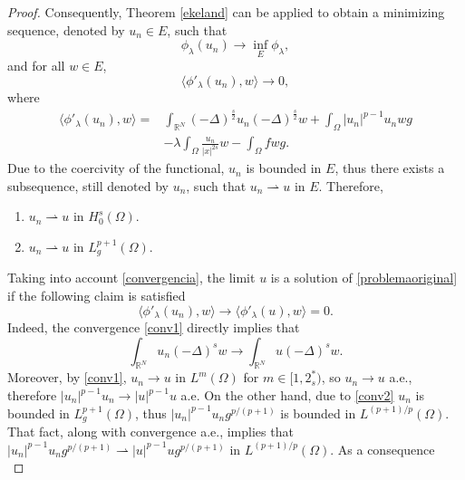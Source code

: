 \documentclass[preprint,12pt]{elsarticle}
\begin{document}
\begin{proof}
			
			Consequently, Theorem \ref{ekeland} can be applied to obtain a minimizing sequence, denoted by $u_n\in E$, such that 
			\[
			\phi_{\lambda}(u_n)\rightarrow \inf_{E}{\phi_{\lambda}},
			\]
			and for all $w\in E$, \begin{equation}\label{convergencia}
				\langle \phi'_{\lambda}(u_n),w\rangle\rightarrow 0,
			\end{equation}
			where 
			\begin{align*}
				\langle \phi'_{\lambda}(u_n),w\rangle=&\int_{\mathbb{R}^N}(-\Delta)^{\frac{s}{2}}u_n(-\Delta)^{\frac{s}{2}}w + \int_{\Omega}|u_n|^{p-1}u_nwg
				\\&-\lambda \int_{\Omega}\frac{u_n}{|x|^{2s}}w-\int_{\Omega}fwg.
			\end{align*}
			Due to the coercivity of the functional, $u_n$ is bounded in $E$, thus there exists a subsequence, still denoted by $u_n$, such that $u_n\rightharpoonup u$ in $E$. Therefore,
			\begingroup 
			\renewcommand{\theenumi}{(\alph{enumi})}
			\renewcommand{\labelenumi}{\theenumi}
			\begin{enumerate}
				\item $u_n\rightharpoonup u$ in $H^s_0(\Omega)$\label{conv1}.
				\item $u_n\rightharpoonup u$ in $L^{p+1}_g(\Omega)$\label{conv2}.
			\end{enumerate}
			\endgroup
			Taking into account \eqref{convergencia}, the limit $u$ is a solution of \eqref{problemaoriginal} if the following claim is satisfied
			\begin{equation}\label{limitsolution}
				\langle \phi'_{\lambda}(u_n),w\rangle\rightarrow \langle \phi'_{\lambda}(u),w\rangle= 0.
			\end{equation}
			Indeed, the convergence \ref{conv1} directly implies that 
			\begin{equation}\label{limitsolution1}
				\int_{\mathbb{R}^N}u_n(-\Delta)^{s}w\rightarrow \int_{\mathbb{R}^N}u(-\Delta)^{s}w.
			\end{equation}
			Moreover, by \ref{conv1}, $u_n\rightarrow u$ in $L^m(\Omega)$ for $m\in [1,2^*_s)$, so $u_n \rightarrow u$ a.e., therefore  $|u_n|^{p-1}u_n\rightarrow |u|^{p-1}u$ a.e.
			On the other hand, due to \ref{conv2} $u_n$ is bounded in $L^{p+1}_g(\Omega)$, thus $|u_n|^{p-1}u_n g^{p/(p+1)}$ is bounded in $ L^{(p+1)/p}(\Omega)$. That fact, along with convergence a.e., implies that $|u_n|^{p-1}u_n g^{p/(p+1)}\rightharpoonup |u|^{p-1}u g^{p/(p+1)}$ in $L^{(p+1)/p}(\Omega)$. As a consequence
			\begin{equation}\label{limitsolution2}

\end{equation}
\end{proof}
\end{document}
